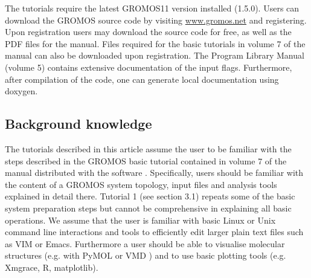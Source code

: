The tutorials require the latest GROMOS11 version installed (1.5.0). 
Users can download the GROMOS source code by visiting \url{www.gromos.net} 
and registering.  Upon registration users may download the source code for free, as well as the PDF files for the manual. Files required for the basic tutorials in volume 7 of the manual can also be downloaded upon registration.
The Program Library Manual (volume 5) \cite{volume_5} 
contains extensive documentation of the input flags. Furthermore, after compilation of the code, one can generate local documentation using doxygen.


\subsection{Background knowledge}
%
The tutorials described in this article assume the user to be familiar with the steps described in the GROMOS basic tutorial contained in volume 7 of the manual distributed with the software \cite{volume_7}. 
Specifically, users should be familiar with the content of a GROMOS system topology, input files and analysis tools explained in detail there.
Tutorial 1 (see section 3.1) repeats some of the basic system preparation steps but cannot be comprehensive in explaining all basic operations. We assume that the user is familiar with basic Linux or Unix 
command line interactions and tools to efficiently edit larger plain text files such as VIM or Emacs. Furthermore a user should be able to visualise molecular structures (e.g. with PyMOL \cite{pymol} or VMD \cite{HUMP96}) 
and to use basic plotting tools (e.g. Xmgrace, R, matplotlib).  

